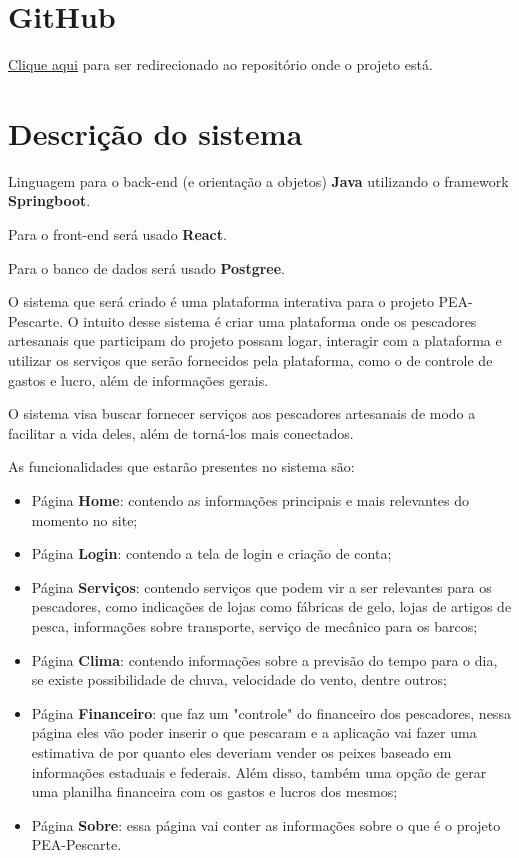 \documentclass[a4paper]{abntex2}
\begin{document}


\tableofcontents %

\newpage %

\section{GitHub}

\href{https://github.com/arthurcezarmol/projeto-POO-Dev}{Clique aqui} para ser redirecionado ao repositório onde o projeto está.

\section{Descrição do sistema}

Linguagem para o back-end (e orientação a objetos) \textbf{Java} utilizando o framework \textbf{Springboot}.

Para o front-end será usado \textbf{React}.

Para o banco de dados será usado \textbf{Postgree}.

O sistema que será criado é uma plataforma interativa para o projeto PEA-Pescarte. O intuito desse sistema é criar uma plataforma onde os pescadores artesanais que participam do projeto possam logar, interagir com a plataforma e utilizar os serviços que serão fornecidos pela plataforma, como o de controle de gastos e lucro, além de informações gerais.

O sistema visa buscar fornecer serviços aos pescadores artesanais de modo a facilitar a vida deles, além de torná-los mais conectados.

As funcionalidades que estarão presentes no sistema são: 

\begin{itemize}
    \item Página \textbf{Home}: contendo as informações principais e mais relevantes do momento no site;
    \item Página \textbf{Login}: contendo a tela de login e criação de conta;
    \item Página \textbf{Serviços}: contendo serviços que podem vir a ser relevantes para os pescadores, como indicações de lojas como fábricas de gelo, lojas de artigos de pesca, informações sobre transporte, serviço de mecânico para os barcos;
    \item Página \textbf{Clima}: contendo informações sobre a previsão do tempo para o dia, se existe possibilidade de chuva, velocidade do vento, dentre outros;
    \item Página \textbf{Financeiro}: que faz um "controle" do financeiro dos pescadores, nessa página eles vão poder inserir o que pescaram e a aplicação vai fazer uma estimativa de por quanto eles deveriam vender os peixes baseado em informações estaduais e federais. Além disso, também uma opção de gerar uma planilha financeira com os gastos e lucros dos mesmos;
    \item Página \textbf{Sobre}: essa página vai conter as informações sobre o que é o projeto PEA-Pescarte.
\end{itemize}
\end{document}
